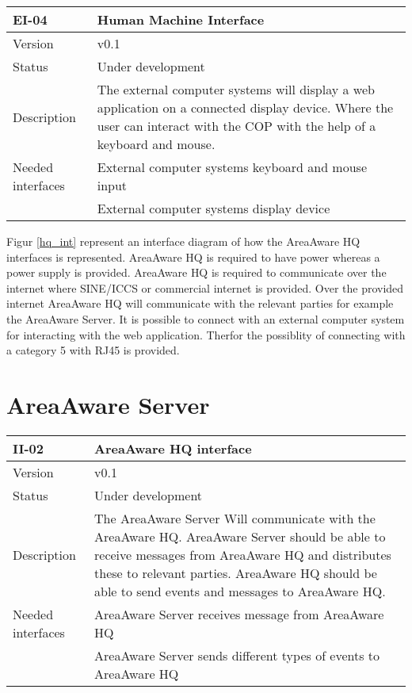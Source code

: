 \begin{longtable}{| p{3.5cm} |  p{10cm} | }
	\hline
	\textbf{EI-04} &  \textbf{Human Machine Interface} \\
	\hline
	Version & v0.1 \\
	\hline
	Status & Under development \\
	\hline
	Description & The external computer systems will display a web application on a connected display device. Where the user can interact with the COP with the help of a keyboard and mouse.
	\\
	\hline
	Needed interfaces 
	& External computer systems keyboard and mouse input \\
	& External computer systems display device \\ 
	\hline
\end{longtable}
\clearpage
{} 

Figur \ref{hq_int} represent an interface diagram of how the AreaAware HQ interfaces is represented. AreaAware HQ is required to have power whereas a power supply is provided. AreaAware HQ is required to communicate over the internet where SINE/ICCS or commercial internet is provided. Over the provided internet AreaAware HQ will communicate with the relevant parties for example the AreaAware Server. It is possible to connect with an external computer system for interacting with the web application. Therfor the possiblity of connecting with a category 5 with RJ45 is provided. 


\section{AreaAware Server}
\label{sec:areaAwareserver}
\begin{longtable}{| p{3.5cm} |  p{10cm} | }
	\hline
	\textbf{II-02} &  \textbf{AreaAware HQ interface } \\
	\hline
	Version & v0.1 \\
	\hline
	Status & Under development \\
	\hline
	Description & The AreaAware Server Will communicate with the AreaAware HQ. AreaAware Server should be able to receive messages from AreaAware HQ and distributes these to relevant parties.  AreaAware HQ should be able to send events and messages to AreaAware HQ.
	\\
	\hline
	Needed interfaces & AreaAware Server receives message from AreaAware HQ \\
	& AreaAware Server sends different types of events to AreaAware HQ \\
	\hline
\end{longtable}

